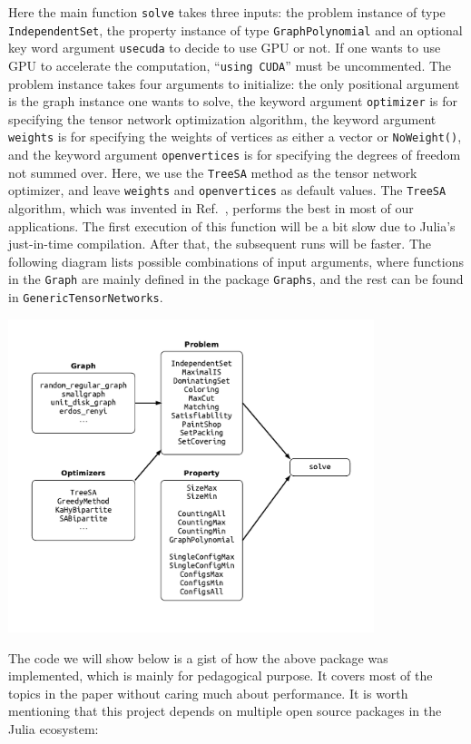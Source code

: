 \documentclass[review,supplement,onefignum,onetabnum]{siamart190516}
\begin{document}
Here the main function \texttt{solve} takes three inputs: the problem instance of type \texttt{IndependentSet}, the property instance of type \texttt{GraphPolynomial} and an optional key word argument \texttt{usecuda} to decide to use GPU or not.
If one wants to use GPU to accelerate the computation, ``\texttt{using CUDA}'' must be uncommented.
The problem instance takes four arguments to initialize: the only positional argument is the graph instance one wants to solve, the keyword argument \texttt{optimizer} is for specifying the tensor network optimization algorithm, the keyword argument \texttt{weights} is for specifying the weights of vertices as either a vector or \texttt{NoWeight()}, and the keyword argument \texttt{openvertices} is for specifying the degrees of freedom not summed over.
Here, we use the \texttt{TreeSA} method as the tensor network optimizer, and leave \texttt{weights} and \texttt{openvertices} as  default values. The \texttt{TreeSA} algorithm, which was invented in Ref.~\cite{Kalachev2021}, performs the best in most of our applications.
The first execution of this function will be a bit slow due to Julia's just-in-time compilation.
After that, the subsequent runs will be faster.
The following diagram lists possible combinations of input arguments, where functions in the \texttt{Graph} are mainly defined in the package \texttt{Graphs}, and the rest can be found in \texttt{GenericTensorNetworks}.

\centerline{\includegraphics[width=0.8\textwidth, trim={0cm 1cm 0cm 1cm}, clip]{figures/fig7.pdf}}

The code we will show below is a gist of how the above package was implemented, which is mainly for pedagogical purpose.
It covers most of the topics in the paper without caring much about performance.
It is worth mentioning that this project depends on multiple open source packages in the Julia ecosystem:
\end{document}
